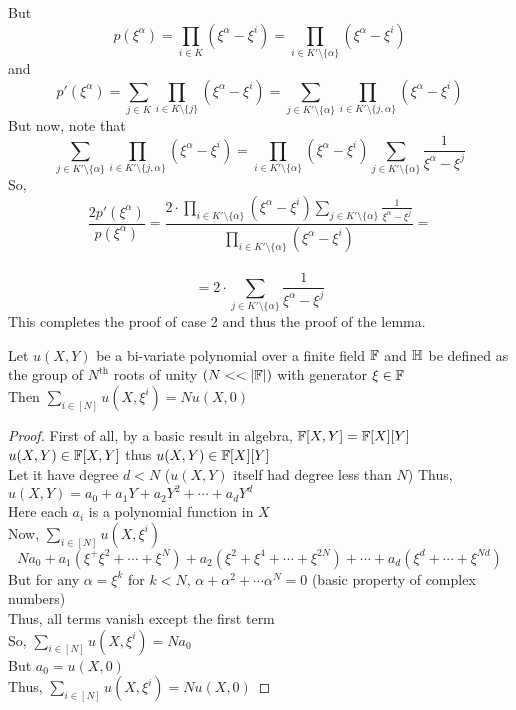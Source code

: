 But $$p(\xi^{\alpha})=\prod_{i \in K}(\xi^{\alpha}-\xi^i)=\prod_{i \in K'\setminus \{\alpha\}}(\xi^{\alpha}-\xi^i)$$ and $$p'(\xi^{\alpha})=\sum_{j \in K} \prod_{i \in K \setminus \{j\}}(\xi^{\alpha}-\xi^i)=\sum_{j \in K'\setminus \{\alpha\}} \prod_{i \in K' \setminus \{j, \alpha\}}(\xi^{\alpha}-\xi^i)$$
But now, note that $$\sum_{j \in K'\setminus \{\alpha\}} \prod_{i \in K' \setminus \{j, \alpha\}}(\xi^{\alpha}-\xi^i)=\prod_{i \in K' \setminus \{ \alpha\}}(\xi^{\alpha}-\xi^i)\sum_{j \in K'\setminus \{\alpha\}}\frac{1}{\xi^{\alpha}-\xi^j}$$
So, $$\frac{2p'(\xi^{\alpha})}{p(\xi^{\alpha})}=\frac{2\cdot \prod_{i \in K' \setminus \{ \alpha\}}(\xi^{\alpha}-\xi^i)\sum_{j \in K'\setminus \{\alpha\}}\frac{1}{\xi^{\alpha}-\xi^j}}{\prod_{i \in K'\setminus \{\alpha\}}(\xi^{\alpha}-\xi^i)}=$$\\
$$=2\cdot\sum_{j \in K'\setminus \{\alpha\}}\frac{1}{\xi^{\alpha}-\xi^j}$$
This completes the proof of case 2 and thus the proof of the lemma.

\begin{lemma}[Sumcheck]\label{lem:sumcheck}
Let $u(X,Y)$ be a bi-variate polynomial over a finite field $\mathbb{F}$ and $\mathbb{H}$ be defined as the group of $N^{\text{th}}$ roots of unity $(N<<|\F|)$ with generator $\xi \in \mathbb{F}$ \\
Then $\sum_{i\in [N]}u(X,\xi^i)= Nu(X,0)$
\end{lemma}

\begin{proof}
    First of all, by a basic result in algebra, $\mathbb{F}[X,Y]=\mathbb{F}[X][Y]$\\
    $u(X,Y) \in \mathbb{F}[X,Y]$ thus $u(X,Y) \in \mathbb{F}[X][Y]$\\
    Let it have degree $d<N$ ($u(X,Y)$ itself had degree less than $N$)
    Thus, $u(X,Y)=a_0+a_1 Y+ a_2 Y^2+\cdots+ a_d Y^d$\\
    Here each $a_i$ is a polynomial function in $X$\\
    Now,  $\sum_{i\in [N]}u(X,\xi^i)$
    $$N a_0+a_1(\xi^+\xi^2+\cdots+\xi^N)+a_2(\xi^2+\xi^4+\cdots+\xi^{2N})+ \cdots + a_d(\xi^d+\cdots +\xi^{Nd})$$
    But for any $\alpha=\xi^k$ for $k<N$, $\alpha+\alpha^2+\cdots \alpha^N=0$ (basic property of complex numbers)\\
    Thus, all terms vanish except the first term\\
    So, $\sum_{i\in [N]}u(X,\xi^i)=N a_0$\\
    But $a_0=u(X, 0)$\\
    Thus, $\sum_{i\in [N]}u(X,\xi^i)=N u(X, 0)$
\end{proof}

